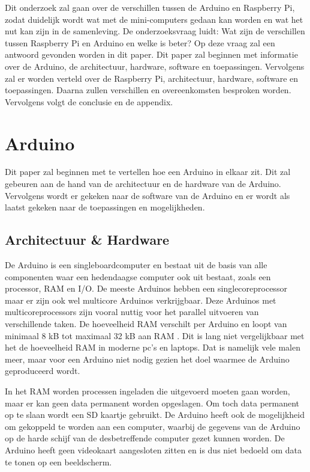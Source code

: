 \documentclass[a4paper, dutch, abstract=true]{scrartcl}
\begin{document}
Dit onderzoek zal gaan over de verschillen tussen de Arduino en Raspberry Pi, zodat duidelijk wordt
wat met de mini-computers gedaan kan worden en wat het nut kan zijn in de samenleving.
De onderzoeksvraag luidt: Wat zijn de verschillen tussen Raspberry Pi en Arduino en welke is beter?
Op deze vraag zal een antwoord gevonden worden in dit paper.
Dit paper zal beginnen met informatie over de Arduino, de architectuur, hardware, software en
toepassingen.
Vervolgens zal er worden verteld over de Raspberry Pi, architectuur, hardware, software en
toepassingen.
Daarna zullen verschillen en overeenkomsten besproken worden.
Vervolgens volgt de conclusie en de appendix.

\section{Arduino}
Dit paper zal beginnen met te vertellen hoe een Arduino in elkaar zit.
Dit zal gebeuren aan de hand van de architectuur en de hardware van de Arduino.
Vervolgens wordt er gekeken naar de software van de Arduino en er wordt als laatst gekeken naar de
toepassingen en mogelijkheden.

\subsection{Architectuur \& Hardware}
De Arduino is een singleboardcomputer en bestaat uit de basis van alle componenten waar een
hedendaagse computer ook uit bestaat, zoals een processor, RAM en I/O.
De meeste Arduinos hebben een singlecoreprocessor maar er zijn ook wel multicore Arduinos
verkrijgbaar.
Deze Arduinos met multicoreprocessors zijn vooral nuttig voor het parallel uitvoeren van
verschillende taken.
De hoeveelheid RAM verschilt per Arduino en loopt van minimaal 8 kB tot maximaal 32 kB aan RAM
\cite{arduino2019products}.
Dit is lang niet vergelijkbaar met het de hoeveelheid RAM in moderne pc's en laptops.
Dat is namelijk vele malen meer, maar voor een Arduino niet nodig gezien het doel waarmee de Arduino
geproduceerd wordt.

In het RAM worden processen ingeladen die uitgevoerd moeten gaan worden, maar er kan geen data
permanent worden opgeslagen.
Om toch data permanent op te slaan wordt een SD kaartje gebruikt.
De Arduino heeft ook de mogelijkheid om gekoppeld te worden aan een computer, waarbij de gegevens
van de Arduino op de harde schijf van de desbetreffende computer gezet kunnen worden.
De Arduino heeft geen videokaart aangesloten zitten en is dus niet bedoeld om data te tonen op een
beeldscherm.
\end{document}

